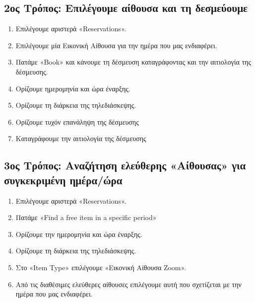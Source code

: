 \documentclass[letterpaper,10pt,greek]{sphinxhowto}
\begin{document}
\subsection{2ος Τρόπος: Επιλέγουμε αίθουσα και τη δεσμεύουμε}
\label{\detokenize{HowToZoom:id3}}\begin{enumerate}
%
\item {} 
\sphinxAtStartPar
Επιλέγουμε αριστερά «Reservations».

\item {} 
\sphinxAtStartPar
Επιλέγουμε μία Εικονική Αίθουσα για την ημέρα που μας ενδιαφέρει.

\item {} 
\sphinxAtStartPar
Πατάμε «Book» και κάνουμε τη δέσμευση καταγράφοντας και την αιτιολογία της δέσμευσης.

\item {} 
\sphinxAtStartPar
Ορίζουμε ημερομηνία και ώρα έναρξης.

\item {} 
\sphinxAtStartPar
Ορίζουμε τη διάρκεια της τηλεδιάσκεψης.

\item {} 
\sphinxAtStartPar
Ορίζουμε τυχόν επανάληψη της δέσμευσης

\item {} 
\sphinxAtStartPar
Καταγράφουμε την αιτιολογία της δέσμευσης

\end{enumerate}


\subsection{3ος Τρόπος: Αναζήτηση ελεύθερης «Αίθουσας» για συγκεκριμένη ημέρα/ώρα}
\label{\detokenize{HowToZoom:id4}}\begin{enumerate}
%
\item {} 
\sphinxAtStartPar
Επιλέγουμε αριστερά «Reservations».

\item {} 
\sphinxAtStartPar
Πατάμε «Find a free item in a specific period»

\item {} 
\sphinxAtStartPar
Ορίζουμε την ημερομηνία και ώρα έναρξης.

\item {} 
\sphinxAtStartPar
Ορίζουμε τη διάρκεια της τηλεδιάσκεψης.

\item {} 
\sphinxAtStartPar
Στο «Item Type» επιλέγουμε «Εικονική Αίθουσα Zoom».

\item {} 
\sphinxAtStartPar
Από τις διαθέσιμες ελεύθερες αίθουσες επιλέγουμε αυτή που σχετίζεται με την ημέρα που μας ενδιαφέρει.

\end{enumerate}



\renewcommand{\indexname}{Ευρετήριο}
\printindex
\end{document}
